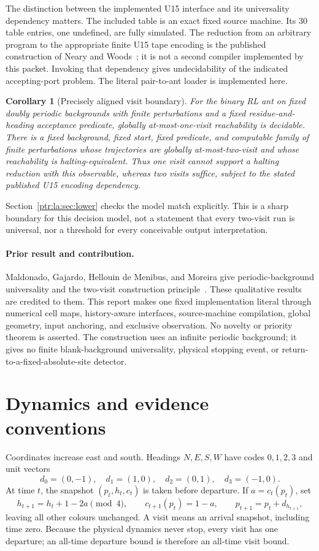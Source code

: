 \documentclass[11pt,letterpaper]{article}
\newtheorem{corollary}[theorem]{Corollary}
\theoremstyle{definition}\newtheorem{definition}[theorem]{Definition}
\theoremstyle{remark}\newtheorem{remark}[theorem]{Remark}
\begin{document}
The distinction between the implemented U15 interface and its universality dependency matters. The included table is an exact fixed source machine. Its 30 table entries, one undefined, are fully simulated. The reduction from an arbitrary program to the appropriate finite U15 tape encoding is the published construction of Neary and Woods~\cite{ptr:la:neary}; it is not a second compiler implemented by this packet. Invoking that dependency gives undecidability of the indicated accepting-port problem. The literal pair-to-ant loader is implemented here.

\begin{corollary}[Precisely aligned visit boundary]\label{ptr:la:cor:boundary}
For the binary RL ant on fixed doubly periodic backgrounds with finite perturbations and a fixed residue-and-heading acceptance predicate, globally at-most-one-visit reachability is decidable. There is a fixed background, fixed start, fixed predicate, and computable family of finite perturbations whose trajectories are globally at-most-two-visit and whose reachability is halting-equivalent. Thus one visit cannot support a halting reduction with this observable, whereas two visits suffice, subject to the stated published U15 encoding dependency.
\end{corollary}
Section~\ref{ptr:la:sec:lower} checks the model match explicitly. This is a sharp boundary for this decision model, not a statement that every two-visit run is universal, nor a threshold for every conceivable output interpretation.

\paragraph{Prior result and contribution.}
Maldonado, Gajardo, Hellouin de Menibus, and Moreira give periodic-background universality and the two-visit construction principle~\cite{ptr:la:maldonado}. These qualitative results are credited to them. This report makes one fixed implementation literal through numerical cell maps, history-aware interfaces, source-machine compilation, global geometry, input anchoring, and exclusive observation. No novelty or priority theorem is asserted. The construction uses an infinite periodic background; it gives no finite blank-background universality, physical stopping event, or return-to-a-fixed-absolute-site detector.

\section{Dynamics and evidence conventions}\label{ptr:la:sec:model}
Coordinates increase east and south. Headings $N,E,S,W$ have codes $0,1,2,3$ and unit vectors
\[
 d_0=(0,-1),\quad d_1=(1,0),\quad d_2=(0,1),\quad d_3=(-1,0).
\]
At time $t$, the snapshot $(p_t,h_t,c_t)$ is taken before departure. If $a=c_t(p_t)$, set
\[
 h_{t+1}=h_t+1-2a\pmod4,\qquad
 c_{t+1}(p_t)=1-a,\qquad p_{t+1}=p_t+d_{h_{t+1}},
\]
leaving all other colours unchanged. A visit means an arrival snapshot, including time zero. Because the physical dynamics never stop, every visit has one departure; an all-time departure bound is therefore an all-time visit bound.
\end{document}
